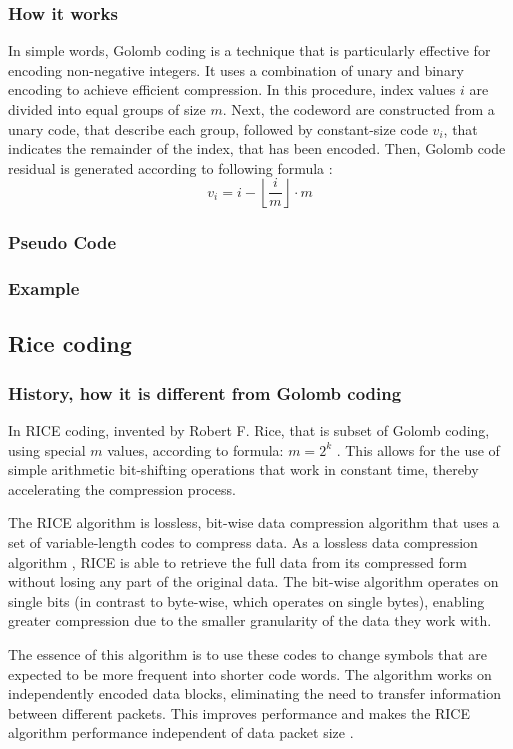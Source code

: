 \documentclass[licencjacka,en]{pracamgr}
\begin{document}
\subsubsection{How it works}
In simple words, Golomb coding is a technique that is particularly effective for encoding non-negative integers. It uses a combination of unary and binary encoding to achieve efficient compression. In this procedure, index values $i$ are divided into equal groups of size $m$. \cite{golomb-coding-work} Next, the codeword are constructed from a unary code, that describe each group, followed by constant-size code $v_i$, that indicates the remainder of the index, that has been encoded.  Then, Golomb code residual is generated according to following formula \cite{golomb-coding-work}:
$$v_i = i - \left\lfloor\frac{i}{m}\right\rfloor \cdot m$$
\subsubsection{Pseudo Code}

\subsubsection{Example}

\subsection{Rice coding}
\subsubsection{History, how it is different from Golomb coding}
In RICE coding, invented by Robert F. Rice, that is subset of Golomb coding, using special $m$ values, according to formula: $m = 2^k$ \cite{golomb-coding-work}. This allows for the use of simple arithmetic bit-shifting operations that work in constant time, thereby accelerating the compression process.

The RICE algorithm is lossless, bit-wise data compression algorithm that uses a set of variable-length codes to compress data. As a lossless data compression algorithm \cite{rice-basics}, RICE is able to retrieve the full data from its compressed form without losing any part of the original data. The bit-wise algorithm operates on single bits (in contrast to byte-wise, which operates on single bytes), enabling greater compression due to the smaller granularity of the data they work with.

The essence of this algorithm is to use these codes to change symbols that are expected to be more frequent into shorter code words. The algorithm works on independently encoded data blocks, eliminating the need to transfer information between different packets. This improves performance and makes the RICE algorithm performance independent of data packet size \cite{rice-codes}.
\end{document}
